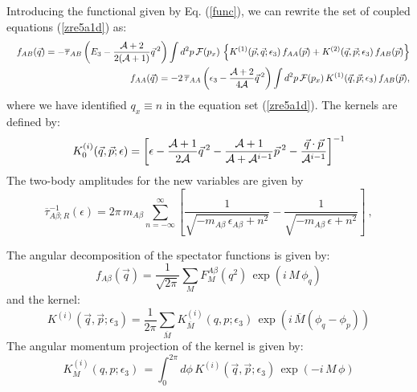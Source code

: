 \documentclass[twocolumn,showpacs,aps,prl,10pt]{revtex4}
\begin{document}
Introducing the functional given by Eq. (\ref{func}), we can rewrite the set of coupled 
equations (\ref{zre5a1d}) as:
\begin{eqnarray}
\nonumber
&&f_{AB}(\vec q) =-\overline\tau_{AB}\left(E_3-\frac{{\cal A}+2}{2({\cal A}+1)} {\vec q}\,^2\right)  
\int d^2p \, {\cal F}(p_x)\,
\left\{ K^{(1)}(\vec p,\vec q;\epsilon_3)\, f_{AA}(\vec p)
+K^{(2)}(\vec q,\vec p;\epsilon_3)
\,f_{AB}(\vec p)\right\}
\\ 
&&f_{AA}(\vec q) =-2\,\overline \tau_{AA}\left(\epsilon_3-\frac{{\cal A}+2}{4{\cal A}} {\vec q}\,^2\right) 
\int d^2p \, {\cal F}(p_x)\, K^{(1)}(\vec q,\vec p;\epsilon_3)
\,f_{AB}(\vec p),
\label{zre5a11d}
\end{eqnarray}
where we have identified $q_x\equiv n$ in the equation set (\ref{zre5a1d}). The kernels are defined by:
\begin{eqnarray}
K^{(i)}_{0}(\vec q,\vec p;\epsilon)=\left[
\epsilon-\frac{{\cal A}+1}{2{\cal A}}\vec q\,^2 -\frac{{\cal A}+1}{{\cal A}+
{\cal A}^{i-1}}\vec p\, ^2-\frac{\vec q\cdot \vec p}{{\cal A}^{i-1}}
\right]^{-1}
\end{eqnarray}
The two-body amplitudes for the new variables are given by
\begin{equation}
\overline \tau^{-1}_{A\beta;R}(\epsilon)=
2\pi \,m_{A\beta}
\sum^\infty_{n=-\infty}\left[
\frac{1}{\sqrt{ -m_{A\beta}\,\epsilon_{A\beta}+n^2}} 
-\frac{1}{\sqrt{-m_{A\beta}\, \epsilon+n^2} }\right]
\ , \label{tauq1d}
\end{equation}

The angular decomposition of the spectator functions is given by:
\begin{equation}
f_{A\beta}(\vec q)=\frac{1}{\sqrt{2\pi}}
\sum_{M}F^{A\beta}_{M}(q^2)\,\exp\left(i\, M\,\phi_q\right)
\end{equation}
and the kernel:
\begin{equation}
K^{(i)}(\vec q,\vec p;\epsilon_3)=\frac{1}{2\pi}\sum_{ \overline M}K^{(i)}_{\overline M}(q, p;\epsilon_3)\,\exp\left(i \,\overline M (\phi_q-\phi_p)\right)
\end{equation}
The angular momentum projection of the kernel is given by:
\begin{equation}
K^{(i)}_{M}(q, p;\epsilon_3)\,= \int^{2\pi}_{0} d\phi \, K^{(i)}(\vec q,\vec p;\epsilon_3)\,\exp(-i \,M\,\phi)
\end{equation}
\end{document}
